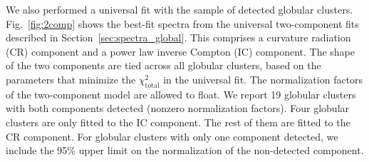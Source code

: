 \documentclass[doublespace,nopageskip]{VTthesis}
\begin{document}
\begin{appendices}
We also performed a universal fit with the sample of detected globular clusters. Fig.~\ref{fig:2comp} shows the best-fit spectra from the universal two-component fits described in Section~\ref{sec:spectra_global}. This comprises a curvature radiation (CR) component and a power law inverse Compton (IC) component. The shape of the two components are tied across all globular clusters, based on the parameters that minimize the $\chi^2_\mathrm{total}$ in the universal fit. The normalization factors of the two-component model are allowed to float. We report 19 globular clusters with both components detected (nonzero normalization factors). Four globular clusters are only fitted to the IC component. The rest of them are fitted to the CR component. For globular clusters with only one component detected, we include the 95\% upper limit on the normalization of the non-detected component.


\end{appendices}
\end{document}
